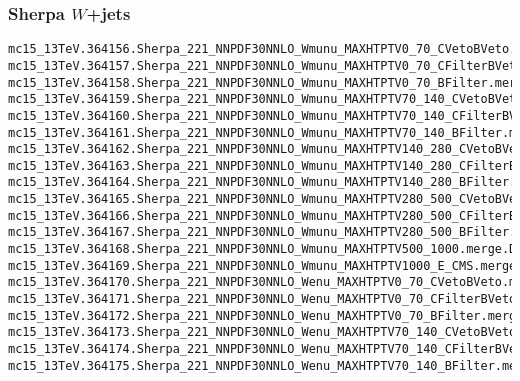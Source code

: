 \begin{scriptsize}
\subsubsection{Sherpa $W$+jets}
\scriptsize
\begin{verbatim}
mc15_13TeV.364156.Sherpa_221_NNPDF30NNLO_Wmunu_MAXHTPTV0_70_CVetoBVeto.merge.DAOD_HIGG5D2.e5340_s2726_r7772_r7676_p2949
mc15_13TeV.364157.Sherpa_221_NNPDF30NNLO_Wmunu_MAXHTPTV0_70_CFilterBVeto.merge.DAOD_HIGG5D2.e5340_s2726_r7772_r7676_p2949
mc15_13TeV.364158.Sherpa_221_NNPDF30NNLO_Wmunu_MAXHTPTV0_70_BFilter.merge.DAOD_HIGG5D2.e5340_s2726_r7772_r7676_p2949
mc15_13TeV.364159.Sherpa_221_NNPDF30NNLO_Wmunu_MAXHTPTV70_140_CVetoBVeto.merge.DAOD_HIGG5D2.e5340_s2726_r7772_r7676_p2949
mc15_13TeV.364160.Sherpa_221_NNPDF30NNLO_Wmunu_MAXHTPTV70_140_CFilterBVeto.merge.DAOD_HIGG5D2.e5340_s2726_r7772_r7676_p2949
mc15_13TeV.364161.Sherpa_221_NNPDF30NNLO_Wmunu_MAXHTPTV70_140_BFilter.merge.DAOD_HIGG5D2.e5340_s2726_r7772_r7676_p2949
mc15_13TeV.364162.Sherpa_221_NNPDF30NNLO_Wmunu_MAXHTPTV140_280_CVetoBVeto.merge.DAOD_HIGG5D2.e5340_s2726_r7772_r7676_p2949
mc15_13TeV.364163.Sherpa_221_NNPDF30NNLO_Wmunu_MAXHTPTV140_280_CFilterBVeto.merge.DAOD_HIGG5D2.e5340_s2726_r7772_r7676_p2949
mc15_13TeV.364164.Sherpa_221_NNPDF30NNLO_Wmunu_MAXHTPTV140_280_BFilter.merge.DAOD_HIGG5D2.e5340_s2726_r7772_r7676_p2949
mc15_13TeV.364165.Sherpa_221_NNPDF30NNLO_Wmunu_MAXHTPTV280_500_CVetoBVeto.merge.DAOD_HIGG5D2.e5340_s2726_r7772_r7676_p2949
mc15_13TeV.364166.Sherpa_221_NNPDF30NNLO_Wmunu_MAXHTPTV280_500_CFilterBVeto.merge.DAOD_HIGG5D2.e5340_s2726_r7772_r7676_p2949
mc15_13TeV.364167.Sherpa_221_NNPDF30NNLO_Wmunu_MAXHTPTV280_500_BFilter.merge.DAOD_HIGG5D2.e5340_s2726_r7772_r7676_p2949
mc15_13TeV.364168.Sherpa_221_NNPDF30NNLO_Wmunu_MAXHTPTV500_1000.merge.DAOD_HIGG5D2.e5340_s2726_r7772_r7676_p2949
mc15_13TeV.364169.Sherpa_221_NNPDF30NNLO_Wmunu_MAXHTPTV1000_E_CMS.merge.DAOD_HIGG5D2.e5340_s2726_r7772_r7676_p2949
mc15_13TeV.364170.Sherpa_221_NNPDF30NNLO_Wenu_MAXHTPTV0_70_CVetoBVeto.merge.DAOD_HIGG5D2.e5340_s2726_r7772_r7676_p2949
mc15_13TeV.364171.Sherpa_221_NNPDF30NNLO_Wenu_MAXHTPTV0_70_CFilterBVeto.merge.DAOD_HIGG5D2.e5340_s2726_r7772_r7676_p2949
mc15_13TeV.364172.Sherpa_221_NNPDF30NNLO_Wenu_MAXHTPTV0_70_BFilter.merge.DAOD_HIGG5D2.e5340_s2726_r7772_r7676_p2949
mc15_13TeV.364173.Sherpa_221_NNPDF30NNLO_Wenu_MAXHTPTV70_140_CVetoBVeto.merge.DAOD_HIGG5D2.e5340_s2726_r7772_r7676_p2949
mc15_13TeV.364174.Sherpa_221_NNPDF30NNLO_Wenu_MAXHTPTV70_140_CFilterBVeto.merge.DAOD_HIGG5D2.e5340_s2726_r7772_r7676_p2949
mc15_13TeV.364175.Sherpa_221_NNPDF30NNLO_Wenu_MAXHTPTV70_140_BFilter.merge.DAOD_HIGG5D2.e5340_s2726_r7772_r7676_p2949

\end{verbatim}
\end{scriptsize}
